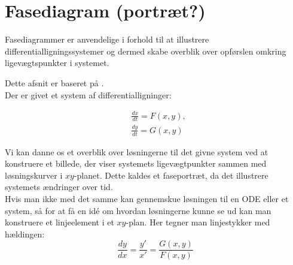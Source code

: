 \chapter{Fasediagram (portræt?)}
Fasediagrammer er anvendelige i forhold til at illustrere differentialligningssystemer og dermed skabe overblik over opførslen omkring ligevægtspunkter i systemet.

Dette afsnit er baseret på \citep[s. 488-490]{EP}. \\
Der er givet et system af differentialligninger:

\begin{equation}
    \begin{aligned}
    &\frac{dx}{dt}=F(x,y),\\ 
    &\frac{dy}{dt}=G(x,y)
    \end{aligned}
\end{equation}

Vi kan danne os et overblik over løsningerne til det givne system ved at konstruere et billede, der viser systemets ligevægtpunkter sammen med løsningskurver i $xy$-planet. Dette kaldes et faseportræt, da det illustrere systemets ændringer over tid. \\
\hfill \break
Hvis man ikke med det samme kan gennemskue løsningen til en ODE eller et system, så for at få en idé om hvordan løsningerne kunne se ud kan man konstruere et linjeelement i et $xy$-plan. Her tegner man linjestykker med hældingen:    
$$\frac{dy}{dx}=\frac{y'}{x'}=\frac{G(x,y)}{F(x,y)}$$

